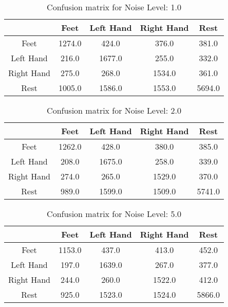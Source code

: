 \begin{table}[!htbp]
    \centering
    \begin{tabular}{|c||c|c|c|c|}
        \hline
		 & Feet & Left Hand & Right Hand & Rest \\
        \hline
        \hline
        Feet & 1274.0 & 424.0 & 376.0 & 381.0 \\
        \hline
        Left Hand & 216.0 & 1677.0 & 255.0 & 332.0 \\
        \hline
        Right Hand & 275.0 & 268.0 & 1534.0 & 361.0 \\
        \hline
        Rest & 1005.0 & 1586.0 & 1553.0 & 5694.0 \\
        \hline
    \end{tabular}
    \caption{Confusion matrix for Noise Level: 1.0}
\end{table}

\begin{table}[!htbp]
    \centering
    \begin{tabular}{|c||c|c|c|c|}
        \hline
		 & Feet & Left Hand & Right Hand & Rest \\
        \hline
        \hline
        Feet & 1262.0 & 428.0 & 380.0 & 385.0 \\
        \hline
        Left Hand & 208.0 & 1675.0 & 258.0 & 339.0 \\
        \hline
        Right Hand & 274.0 & 265.0 & 1529.0 & 370.0 \\
        \hline
        Rest & 989.0 & 1599.0 & 1509.0 & 5741.0 \\
        \hline
    \end{tabular}
    \caption{Confusion matrix for Noise Level: 2.0}
\end{table}

\begin{table}[!htbp]
    \centering
    \begin{tabular}{|c||c|c|c|c|}
        \hline
		 & Feet & Left Hand & Right Hand & Rest \\
        \hline
        \hline
        Feet & 1153.0 & 437.0 & 413.0 & 452.0 \\
        \hline
        Left Hand & 197.0 & 1639.0 & 267.0 & 377.0 \\
        \hline
        Right Hand & 244.0 & 260.0 & 1522.0 & 412.0 \\
        \hline
        Rest & 925.0 & 1523.0 & 1524.0 & 5866.0 \\
        \hline
    \end{tabular}
    \caption{Confusion matrix for Noise Level: 5.0}
\end{table}

